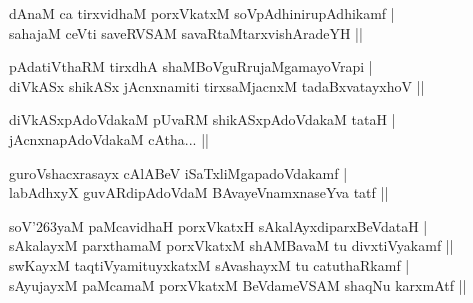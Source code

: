 \begin{entry}
\label{BeVda}
\medskip
\begin{shl}
dAnaM ca tirxvidhaM porxVkatxM soVpAdhinirupAdhikamf |\\[2pt]
sahajaM ceVti saveRVSAM savaRtaMtarxvishAradeYH ||\\[-1pt]
\end{shl}
\medskip
{}
\vskip 5pt
\vskip 5pt
\medskip
\begin{shl}
pAdatiVthaRM tirxdhA shaMBoVguRrujaMgamayoVrapi |\\[2pt]
diVkASx shikASx jAcnxnamiti tirxsaMjacnxM tadaBxvatayxhoV ||\\[-1pt]
\end{shl}
\medskip
{}
\medskip
\begin{shl}
diVkASxpAdoVdakaM pUvaRM shikASxpAdoVdakaM tataH |\\[2pt]
jAcnxnapAdoVdakaM cAtha... ||\\[-1pt]
\end{shl}
\medskip
{}
\medskip
\begin{shl}
guroVshacxrasayx cAlABeV iSaTxliMgapadoVdakamf |\\[2pt]
labAdhxyX guvARdipAdoVdaM BAvayeVnamxnaseYva tatf ||\\[-1pt]
\end{shl}
\medskip
{}
\smallskip
{}
\medskip
\begin{shl}
soV{\char'263}yaM paMcavidhaH porxVkatxH sAkalAyxdiparxBeVdataH |\\[2pt]
sAkalayxM parxthamaM porxVkatxM shAMBavaM tu divxtiVyakamf ||\\[2pt]
swKayxM taqtiVyamituyxkatxM sAvashayxM tu catuthaRkamf |\\[2pt]
sAyujayxM paMcamaM porxVkatxM BeVdameVSAM shaqNu karxmAtf ||\\[-1pt]

\end{shl}
\end{entry}
